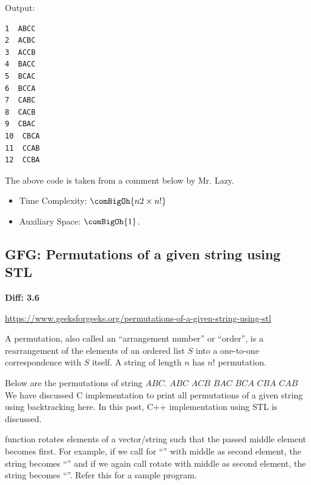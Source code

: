 Output:
\begin{lstlisting}[style=rayio]
1  ABCC
2  ACBC
3  ACCB
4  BACC
5  BCAC
6  BCCA
7  CABC
8  CACB
9  CBAC
10  CBCA
11  CCAB
12  CCBA
\end{lstlisting}
The above code is taken from a comment below by Mr. Lazy.
\begin{itemize}[noitemsep,topsep=0pt]
\item Time Complexity: $\comBigOh{n2\times n!}$
\item Auxiliary Space: $\comBigOh{1}$.
\end{itemize}

\subsection{GFG: Permutations of a given string using STL
  \label{secGFGPrntAllDstnctPrmttnsOfAGvnStrngWthDuplcts}}

\noindent{}\textbf{Diff: 3.6}

\url{https://www.geeksforgeeks.org/permutations-of-a-given-string-using-stl}

A permutation, also called an ``arrangement number'' or ``order'', is a 
rearrangement of the elements of an ordered list $S$ into a one-to-one 
correspondence with $S$ itself. A string of length $n$ has $n!$ permutation.

Below are the permutations of string $ABC$.
$ABC$ $ACB$ $BAC$ $BCA$ $CBA$ $CAB$
We have discussed C implementation to print all permutations of a given
string using backtracking here. In this post, C++ implementation using STL
is discussed.


 function rotates elements of a vector/string such that the
passed middle element becomes first. For example, if we call 
for ``'' with middle as second element, the string becomes
``'' and if we again call rotate with middle as second element,
the string becomes ``''.  Refer this for a sample program.

